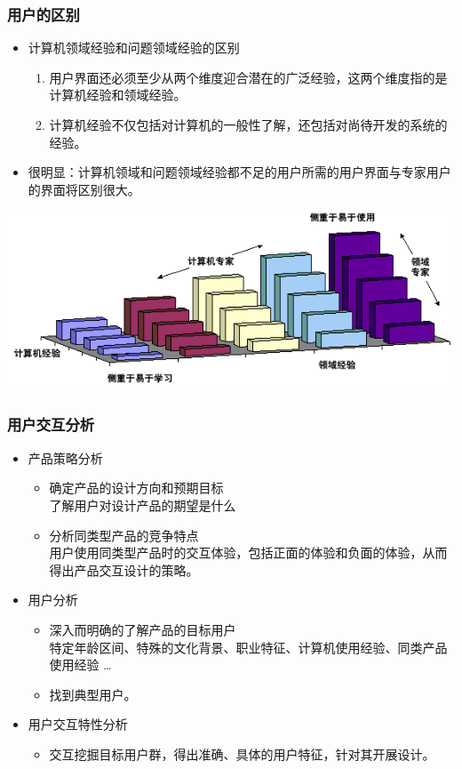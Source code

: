\documentclass{beamer}
\begin{document}
\begin{frame}
	\frametitle{用户的区别}
	\beamertemplatetransparentcovereddynamicmedium
	\begin{itemize}[<+->]
		\item 计算机领域经验和问题领域经验的区别
		\begin{enumerate}
			\item 用户界面还必须至少从两个维度迎合潜在的广泛经验，这两个维度指的是计算机经验和领域经验。
			\item 计算机经验不仅包括对计算机的一般性了解，还包括对尚待开发的系统的经验。
		\end{enumerate}
		\item 很明显：计算机领域和问题领域经验都不足的用户所需的用户界面与专家用户的界面将区别很大。
	\end{itemize}
	\begin{center}
	\includegraphics[width=.7\textwidth]{images/user-experts.png}
	\end{center}
\end{frame}

\begin{frame}
	\frametitle{用户交互分析}
	\beamertemplatetransparentcovereddynamicmedium
	\begin{itemize}
		\item 产品策略分析
		\begin{itemize}
			\item 确定产品的设计方向和预期目标\\{\tiny 了解用户对设计产品的期望是什么}
			\item 分析同类型产品的竞争特点\\{\tiny 用户使用同类型产品时的交互体验，包括正面的体验和负面的体验，从而得出产品交互设计的策略。}
		\end{itemize}
		\pause
		\item 用户分析
		\begin{itemize}
			\item 深入而明确的了解产品的目标用户\\{\tiny 特定年龄区间、特殊的文化背景、职业特征、计算机使用经验、同类产品使用经验 \dots}
			\item 找到典型用户。
		\end{itemize}
		\pause
		\item 用户交互特性分析
		\begin{itemize}
			\item 交互挖掘目标用户群，得出准确、具体的用户特征，针对其开展设计。
		\end{itemize}
	\end{itemize}
\end{frame}
\end{document}
